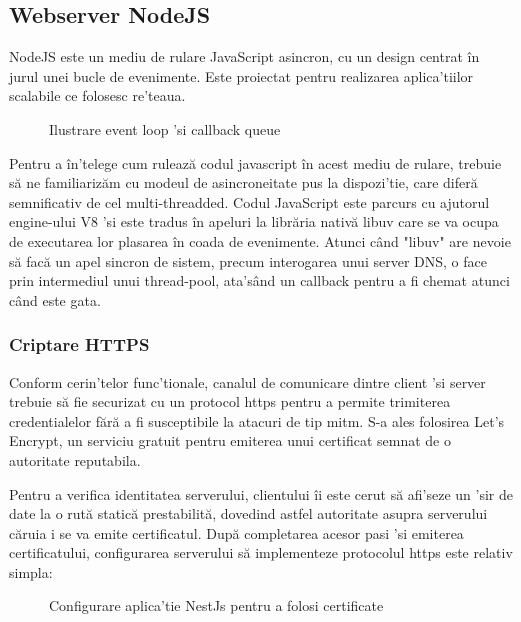 \subsection {Webserver NodeJS}

NodeJS este un mediu de rulare JavaScript asincron, cu un design centrat în jurul unei bucle de evenimente. Este proiectat pentru realizarea aplica'tiilor scalabile ce folosesc re'teaua. \cite{NodeJs2021}

\begin{figure}[H]
  \centering
  \caption{Ilustrare event loop 'si callback queue \cite{DevelopPaper2019}}
\end{figure}

Pentru a în'telege cum rulează codul javascript în acest mediu de rulare, trebuie să ne familiarizăm cu modeul de asincroneitate pus la dispozi'tie, care diferă semnificativ de cel multi-threadded. Codul JavaScript este parcurs cu ajutorul engine-ului V8 'si este tradus în apeluri la librăria nativă libuv care se va ocupa de executarea lor plasarea în coada de evenimente. Atunci când "libuv" are nevoie să facă un apel sincron de sistem, precum interogarea unui server DNS, o face prin intermediul unui thread-pool, ata'sând un callback pentru a fi chemat atunci când este gata.

\subsubsection {Criptare HTTPS}

Conform cerin'telor func'tionale, canalul de comunicare dintre client 'si server trebuie să fie securizat cu un protocol \acrfull{https} pentru a permite trimiterea credentialelor fără a fi susceptibile la atacuri de tip \acrfull{mitm}. S-a ales folosirea Let's Encrypt, un serviciu gratuit pentru emiterea unui certificat semnat de o autoritate reputabila.

Pentru a verifica identitatea serverului, clientului îi este cerut să afi'seze un 'sir de date la o rută statică prestabilită, dovedind astfel autoritate asupra serverului căruia i se va emite certificatul. După completarea acesor pasi 'si emiterea certificatului, configurarea serverului să implementeze protocolul \acrshort{https} este relativ simpla:

\begin{figure}[H]
  \centering
  \caption{Configurare aplica'tie NestJs pentru a folosi certificate}
\end{figure}

